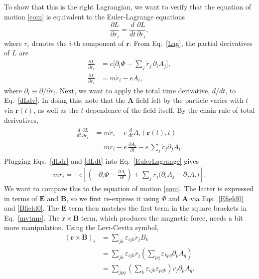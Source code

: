 \documentclass[prx,12pt]{revtex4-2}
\begin{document}
To show that this is the right Lagrangian, we want to verify that the
equation of motion \eqref{eom} is equivalent to the Euler-Lagrange
equations
\begin{equation}
  \frac{\partial L}{\partial r_i} = \frac{d}{dt}
  \frac{\partial L}{\partial \dot{r}_i},
  \label{EulerLagrange}
\end{equation}
where $r_i$ denotes the $i$-th component of $\mathbf{r}$.  From
Eq.~\eqref{Lag}, the partial derivatives of $L$ are
\begin{align}
  \frac{\partial L}{\partial r_i} &=
  e\Big[\partial_i \Phi - \sum_j \dot{r}_j \,\partial_i A_j \Big],\label{dLdr}\\
  \frac{\partial L}{\partial \dot{r}_i} &= m\dot{r}_i - e A_i,
  \label{dLdv}
\end{align}
where $\partial_i \equiv \partial/\partial r_i$.  Next, we want to
apply the total time derivative, $d/dt$, to Eq.~\eqref{dLdv}.  In
doing this, note that the $\mathbf{A}$ field felt by the particle
varies with $t$ via $\mathbf{r}(t)$, as well as the $t$-dependence of
the field itself.  By the chain rule of total derivatives,
\begin{align}
  \begin{aligned}
    \frac{d}{dt} \frac{\partial L}{\partial \dot{r}_i}
    &= m\ddot{r}_i - e\, \frac{d}{dt} A_i(\mathbf{r}(t),t) \\
    &= m\ddot{r}_i - e\, \frac{\partial A_i}{\partial t}
    - e\, \sum_j \dot{r}_j \partial_j A_i.
  \end{aligned}
  \label{dLdt}
\end{align}
Plugging Eqs.~\eqref{dLdr} and \eqref{dLdt} into
Eq.~\eqref{EulerLagrange} gives
\begin{align}
  m\ddot{r}_i =
  -e\left[\left(-\partial_i \Phi - \frac{\partial A_i}{\partial t}\right)
    + \sum_j \dot{r}_j \Big( \partial_i A_j - \partial_j A_i\Big) \right].
  \label{mvtmp}
\end{align}
We want to compare this to the equation of motion \eqref{eom}.  The
latter is expressed in terms of $\mathbf{E}$ and $\mathbf{B}$, so we
first re-express it using $\Phi$ and $\mathbf{A}$ via
Eqs.~\eqref{Efield0} and \eqref{Bfield0}.  The $\mathbf{E}$ term then
matches the first term in the square brackets in Eq.~\eqref{mvtmp}.
The $\dot{\mathbf{r}}\times\mathbf{B}$ term, which produces the
magnetic force, needs a bit more manipulation.  Using the Levi-Cevita
symbol,
\begin{align}
  (\dot{\mathbf{r}} \times \mathbf{B})_i &=
  \sum_{jk} \varepsilon_{ijk} \dot{r}_j B_k \\
  &= \sum_{jk} \varepsilon_{ijk} \dot{r}_j \left(\sum_{pq} \varepsilon_{kpq} \partial_p A_q  \right) \\
  &= \sum_{jpq} \left(\sum_k \varepsilon_{ijk} \varepsilon_{pqk}\right)
  \dot{r}_j  \partial_p A_q.
  \label{vBtmp}
\end{align}
\end{document}
